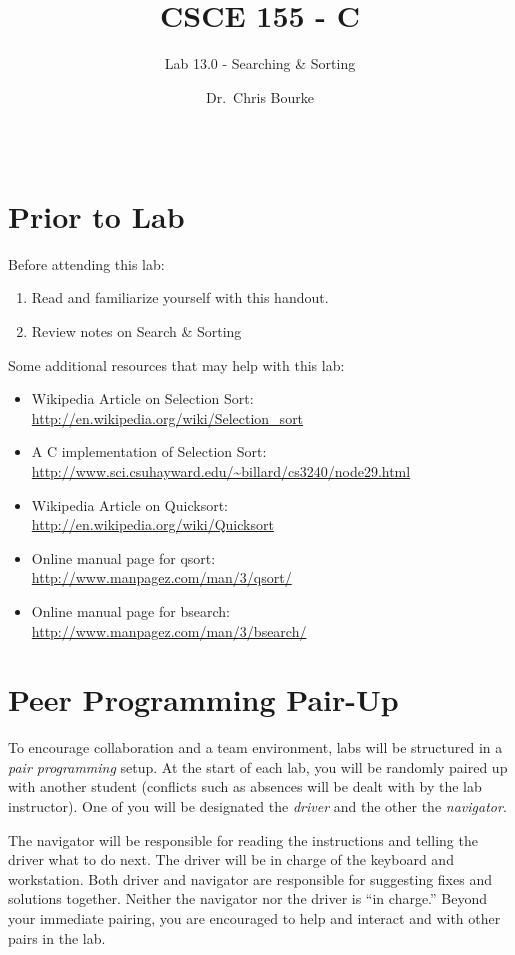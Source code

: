 \documentclass[12pt]{scrartcl}
\title{CSCE 155 - C}
\subtitle{Lab 13.0 - Searching \& Sorting}
\author{Dr.\ Chris Bourke}
\date{~}
\begin{document}
\maketitle

\section*{Prior to Lab}

Before attending this lab:
\begin{enumerate}
  \item Read and familiarize yourself with this handout.
  \item Review notes on Search \& Sorting
\end{enumerate}

Some additional resources that may help with this lab:
\begin{itemize}
  \item Wikipedia Article on Selection Sort: \\
  	\url{http://en.wikipedia.org/wiki/Selection_sort}
  \item A C implementation of Selection Sort: \\
  	\url{http://www.sci.csuhayward.edu/~billard/cs3240/node29.html}
  \item Wikipedia Article on Quicksort: \\
  	\url{http://en.wikipedia.org/wiki/Quicksort}
  \item Online manual page for qsort: \\
  	\url{http://www.manpagez.com/man/3/qsort/}
  \item Online manual page for bsearch: \\
  	\url{http://www.manpagez.com/man/3/bsearch/}
\end{itemize}

\section*{Peer Programming Pair-Up}

To encourage collaboration and a team environment, labs will be
structured in a \emph{pair programming} setup.  At the start of
each lab, you will be randomly paired up with another student 
(conflicts such as absences will be dealt with by the lab instructor).
One of you will be designated the \emph{driver} and the other
the \emph{navigator}.  

The navigator will be responsible for reading the instructions and
telling the driver what to do next.  The driver will be in charge of the
keyboard and workstation.  Both driver and navigator are responsible
for suggesting fixes and solutions together.  Neither the navigator
nor the driver is ``in charge.''  Beyond your immediate pairing, you
are encouraged to help and interact and with other pairs in the lab.
\end{document}
